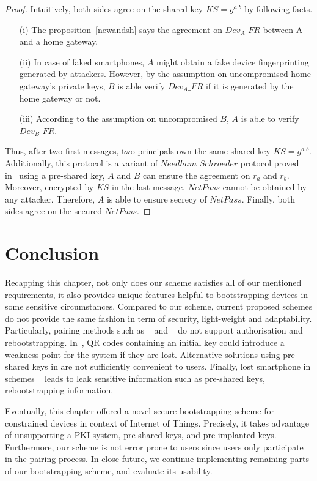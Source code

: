 \begin{proof}

Intuitively, both sides agree on the shared key $KS = g^{a.b}$ by following facts. 
\begin{enumerate}
\item [(i)] The proposition~\ref{newandsh} says the agreement on $Dev_{A}\_FR$ between A and a home gateway.
\item [(ii)] In case of faked smartphones, $A$ might obtain a fake device fingerprinting generated by attackers. However, by the assumption on uncompromised home gateway's private keys, $B$ is able verify $Dev_{A}\_FR$ if it is generated by the home gateway or not. 
\item [(iii)] According to the assumption on uncompromised $B$, $A$ is able to verify $Dev_{B}\_FR$. 
\end{enumerate}

Thus, after two first messages, two principals own the same shared key $KS = g^{a.b}$. Additionally, this protocol is a variant of $Needham$ $Schroeder$ protocol proved in~\cite{674832} using a pre-shared key, $A$ and $B$ can ensure the agreement on $r_a$ and $r_b$. 
Moreover, encrypted by $KS$ in the last message, $NetPass$ cannot be obtained by any attacker. Therefore, $A$ is able to ensure secrecy of $NetPass$. Finally, both sides agree on the secured $NetPass$. 
\end{proof}

\section{Conclusion}\label{conclusion}

Recapping this chapter, not only does our scheme satisfies all of our mentioned requirements, it also provides unique features helpful to bootstrapping devices in some sensitive circumstances. Compared to our scheme, current proposed schemes do not provide the same fashion in term of security, light-weight and adaptability. Particularly, pairing methods such as ~\cite{4159919} and ~\cite{5654588} do not support authorisation and rebootstrapping. In~\cite{Seung2015, Jeanning2013}, QR codes containing an initial key could introduce a weakness point for the system if they are lost. Alternative solutions using pre-shared keys in \cite{JCMjcm0708634642, Cha:2011:LSE:1968613.1968679, Ikram:2009:SLA:1582379.1582583, 6263790, rfc5191} are not sufficiently convenient to users. Finally, lost smartphone in schemes ~\cite{Seung2015, 6934398} leads to leak sensitive information such as pre-shared keys, rebootstrapping information.

Eventually, this chapter offered a novel secure bootstrapping scheme for constrained devices in context of Internet of Things. Precisely, it takes advantage of unsupporting a PKI system, pre-shared keys, and pre-implanted keys. Furthermore, our scheme is not error prone to users since users only participate in the pairing process. In close future, we continue implementing remaining parts of our bootstrapping scheme, and evaluate its usability.






